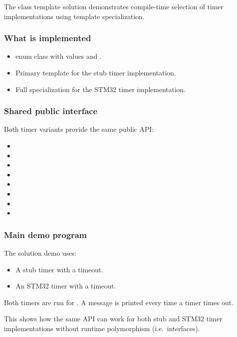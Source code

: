 The class template solution demonstrates compile-time selection of timer implementations using
template specialization.

\subsubsection{What is implemented}
\begin{itemize}
  \item {} enum class with values  and .
  \item Primary template  for the stub timer
    implementation.
  \item Full specialization  for the STM32 timer
    implementation.
\end{itemize}

\subsubsection{Shared public interface}
Both timer variants provide the same public API:
\begin{itemize}
  \item {}
  \item {}
  \item {}
  \item {}
  \item {}
  \item {}
  \item {}
  \item {}
\end{itemize}

\subsubsection{Main demo program}
The solution demo uses:
\begin{itemize}
  \item A stub timer with a  timeout.
  \item An STM32 timer with a  timeout.
\end{itemize}
Both timers are run for . A message is printed every time a timer times out.

This shows how the same API can work for both stub and STM32 timer implementations without
runtime polymorphism (i.e.\ interfaces).

